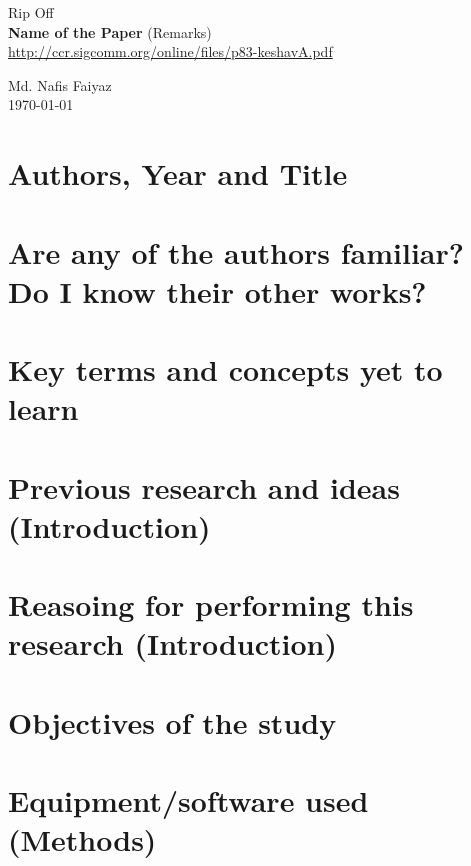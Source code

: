 \documentclass{article}
\begin{document}
\begin{titlepage}

    \begin{center}
        
        {\LARGE
            Rip Off\\
            \vspace{0.5cm}
            \textbf{Name of the Paper} (Remarks)
        }\\
        \vspace{1cm}
        \url{http://ccr.sigcomm.org/online/files/p83-keshavA.pdf}
        
        \vfill
        
        {\large Md. Nafis Faiyaz}\\
        \today
        
    \end{center}
    
\end{titlepage}

\section{Authors, Year and Title}

\section{Are any of the authors familiar? Do I know their other works?}

\section{Key terms and concepts yet to learn}

\section{Previous research and ideas (Introduction)}

\section{Reasoing for performing this research (Introduction)}

\section{Objectives of the study}

\section{Equipment/software used (Methods)}
\end{document}
